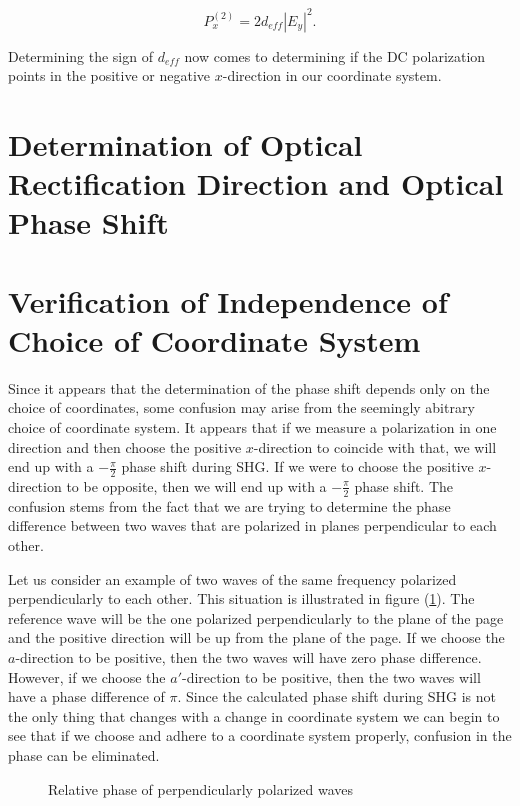 \begin{equation}
P^{(2)}_x = 2d_{eff} \left| E_y \right|^2.
\end{equation}

Determining the sign of $d_{eff}$ now comes to determining if the
DC polarization points in the positive or negative $x$-direction
in our coordinate system.

\section{Determination of Optical Rectification Direction and Optical Phase Shift}





\section{Verification of Independence of Choice of Coordinate System}

Since it appears that the determination of the phase shift depends 
only on the choice of coordinates, some confusion may arise from 
the seemingly abitrary choice of coordinate system.  It appears that
if we measure a polarization in one direction and then choose the
positive $x$-direction to coincide with that, we will end up with a 
$-\frac{\pi}{2}$ phase shift during SHG.  If we were to choose the 
positive $x$-direction to be opposite, then we will end up with a 
$-\frac{\pi}{2}$ phase shift.  The confusion stems from the fact that 
we are trying to determine the phase difference between two waves that
are polarized in planes perpendicular to each other.

Let us consider an example of two waves of the same frequency polarized 
perpendicularly to each other.  This situation is illustrated in figure
(\ref{perppol}).  The reference wave will be the one polarized perpendicularly
to the plane of the page and the positive direction will be up from the
plane of the page.  If we choose the $a$-direction to be positive, then the
two waves will have zero phase difference.  However, if we choose the $a'$-direction
to be positive, then the two waves will have a phase difference of $\pi$.
Since the calculated phase shift during SHG is not the only thing that 
changes with a change in coordinate system we can begin to see that 
if we choose and adhere to a coordinate system properly, confusion in 
the phase can be eliminated.

\begin{figure}
\caption[Relative phase of perpendicularly polarized waves]{Relative 
phase of perpendicularly polarized waves}
\label{perppol}
\end{figure}


